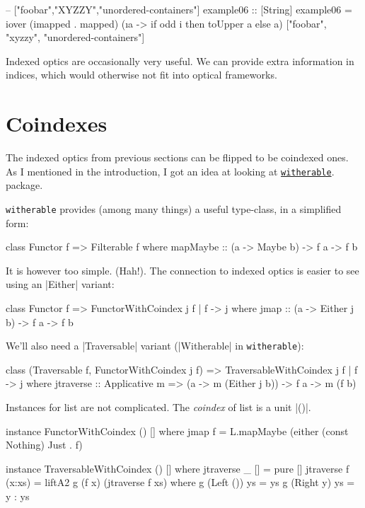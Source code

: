 \begin{code}
-- ["foobar","XYZZY","unordered-containers"]
example06 :: [String]
example06 = iover
    (imapped . mapped)
    (\i a -> if odd i then toUpper a else a)
    ["foobar", "xyzzy", "unordered-containers"]
\end{code}

Indexed optics are occasionally very useful.
We can provide extra information in indices,
which would otherwise not fit into optical frameworks.

\section{Coindexes}

The indexed optics from previous sections can be flipped to be coindexed ones.
As I mentioned in the introduction, I got an idea at looking at
\href{https://hackage.haskell.org/package/witherable}{\texttt{witherable}}.
package.

\texttt{witherable} provides (among many things) a useful type-class,
in a simplified form:

\begin{code}
class Functor f => Filterable f where
    mapMaybe :: (a -> Maybe b) -> f a -> f b
\end{code}

It is however too simple. (Hah!).
The connection to indexed optics is easier to see using
an |Either| variant:

\begin{code}
class Functor f => FunctorWithCoindex j f | f -> j where
    jmap :: (a -> Either j b) -> f a -> f b
\end{code}

We'll also need a |Traversable| variant (|Witherable| in \texttt{witherable}):

\begin{code}
class (Traversable f, FunctorWithCoindex j f)
    => TraversableWithCoindex j f | f -> j
  where
    jtraverse :: Applicative m => (a -> m (Either j b)) -> f a -> m (f b)
\end{code}

Instances for list are not complicated.
The \emph{coindex} of list is a unit |()|.

\begin{code}
instance FunctorWithCoindex () [] where
    jmap f = L.mapMaybe (either (const Nothing) Just . f)

instance TraversableWithCoindex () [] where
    jtraverse _ [] = pure []
    jtraverse f (x:xs) = liftA2 g (f x) (jtraverse f xs) where
        g (Left ()) ys = ys
        g (Right y) ys = y : ys
\end{code}

